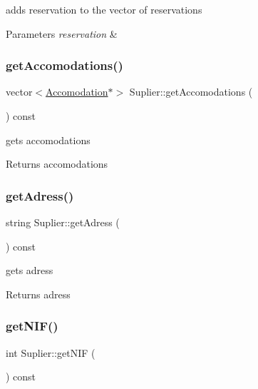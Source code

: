 adds reservation to the vector of reservations 


\begin{DoxyParams}{Parameters}
{\em reservation} & \\
\hline
\end{DoxyParams}
\hypertarget{class_suplier_a87e65aee86b034f1b4a112abb83ff53a}{}\label{class_suplier_a87e65aee86b034f1b4a112abb83ff53a} 
\subsubsection{\texorpdfstring{get\+Accomodations()}{getAccomodations()}}
{\footnotesize\ttfamily vector$<$\hyperlink{class_accomodation}{Accomodation}$\ast$$>$ Suplier\+::get\+Accomodations (\begin{DoxyParamCaption}{ }\end{DoxyParamCaption}) const\hspace{0.3cm}{\ttfamily [inline]}}



gets accomodations 

\begin{DoxyReturn}{Returns}
accomodations 
\end{DoxyReturn}
\hypertarget{class_suplier_ad6e654f4f26f6268b50f51df117793fb}{}\label{class_suplier_ad6e654f4f26f6268b50f51df117793fb} 
\subsubsection{\texorpdfstring{get\+Adress()}{getAdress()}}
{\footnotesize\ttfamily string Suplier\+::get\+Adress (\begin{DoxyParamCaption}{ }\end{DoxyParamCaption}) const\hspace{0.3cm}{\ttfamily [inline]}}



gets adress 

\begin{DoxyReturn}{Returns}
adress 
\end{DoxyReturn}
\hypertarget{class_suplier_ae200d0fc598080361dccfc947dd071c5}{}\label{class_suplier_ae200d0fc598080361dccfc947dd071c5} 
\subsubsection{\texorpdfstring{get\+N\+I\+F()}{getNIF()}}
{\footnotesize\ttfamily int Suplier\+::get\+N\+IF (\begin{DoxyParamCaption}{ }\end{DoxyParamCaption}) const\hspace{0.3cm}{\ttfamily [inline]}}



